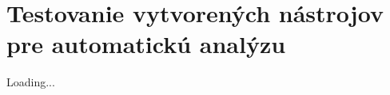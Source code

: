 \chapter{Testovanie vytvorených nástrojov pre automatickú analýzu}
\label{tests-for-analysis-tools-created}

Loading...